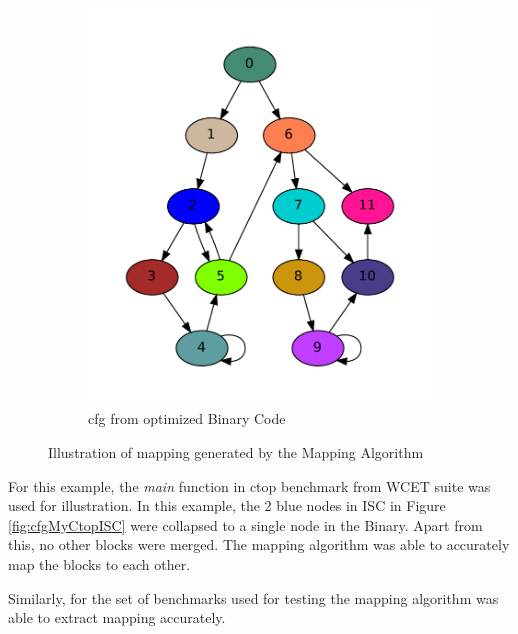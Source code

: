 \begin{figure}[h!]
\begin{subfigure}[t]{.5\textwidth}
\includegraphics[width=\textwidth]{figures/obj_my_ctop_IR_main.pdf}
\caption{\gls{cfg} from optimized Binary Code}
\label{fig:cfgMyCtopBin}
\end{subfigure}%
\caption{Illustration of mapping generated by the Mapping Algorithm}
\label{fig:MyCtopMapping}
\end{figure}

For this example, the \emph{main} function in ctop benchmark from WCET suite \cite{WCET} was used for illustration. In this example, the 2 blue nodes in ISC in Figure \ref{fig:cfgMyCtopISC} were collapsed to a single node in the Binary. Apart from this, no other blocks were merged. The mapping algorithm was able to accurately map the blocks to each other.

Similarly, for the set of benchmarks used for testing the mapping algorithm was able to extract mapping accurately.

